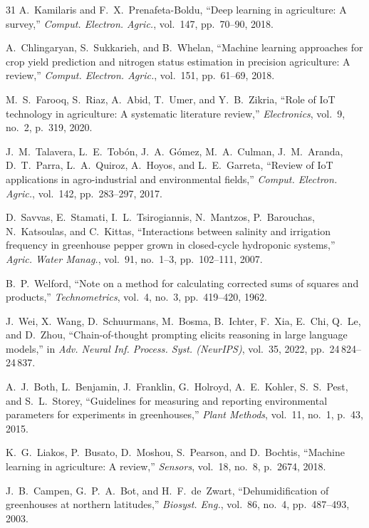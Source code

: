 \documentclass[journal,10pt,twocolumn]{IEEEtran}
\begin{document}
\begin{thebibliography}{31}
A.~Kamilaris and F.~X.~Prenafeta-Boldu,
``Deep learning in agriculture: A survey,''
\emph{Comput. Electron. Agric.}, vol.~147, pp.~70--90, 2018.

A.~Chlingaryan, S.~Sukkarieh, and B.~Whelan,
``Machine learning approaches for crop yield prediction and
nitrogen status estimation in precision agriculture: A review,''
\emph{Comput. Electron. Agric.}, vol.~151, pp.~61--69, 2018.

M.~S.~Farooq, S.~Riaz, A.~Abid, T.~Umer, and Y.~B.~Zikria,
``Role of IoT technology in agriculture: A systematic literature
review,''
\emph{Electronics}, vol.~9, no.~2, p.~319, 2020.

J.~M.~Talavera, L.~E.~Tobón, J.~A.~Gómez, M.~A.~Culman,
J.~M.~Aranda, D.~T.~Parra, L.~A.~Quiroz, A.~Hoyos, and
L.~E.~Garreta,
``Review of IoT applications in agro-industrial and environmental
fields,''
\emph{Comput. Electron. Agric.}, vol.~142, pp.~283--297, 2017.

D.~Savvas, E.~Stamati, I.~L.~Tsirogiannis, N.~Mantzos,
P.~Barouchas, N.~Katsoulas, and C.~Kittas,
``Interactions between salinity and irrigation frequency in
greenhouse pepper grown in closed-cycle hydroponic systems,''
\emph{Agric. Water Manag.}, vol.~91, no.~1--3, pp.~102--111,
2007.

B.~P.~Welford,
``Note on a method for calculating corrected sums of squares
and products,''
\emph{Technometrics}, vol.~4, no.~3, pp.~419--420, 1962.

J.~Wei, X.~Wang, D.~Schuurmans, M.~Bosma, B.~Ichter, F.~Xia,
E.~Chi, Q.~Le, and D.~Zhou,
``Chain-of-thought prompting elicits reasoning in large language
models,''
in \emph{Adv. Neural Inf. Process. Syst. (NeurIPS)}, vol.~35,
2022, pp.~24\,824--24\,837.

A.~J.~Both, L.~Benjamin, J.~Franklin, G.~Holroyd, A.~E.~Kohler,
S.~S.~Pest, and S.~L.~Storey,
``Guidelines for measuring and reporting environmental parameters
for experiments in greenhouses,''
\emph{Plant Methods}, vol.~11, no.~1, p.~43, 2015.

K.~G.~Liakos, P.~Busato, D.~Moshou, S.~Pearson, and
D.~Bochtis,
``Machine learning in agriculture: A review,''
\emph{Sensors}, vol.~18, no.~8, p.~2674, 2018.

J.~B.~Campen, G.~P.~A.~Bot, and H.~F.~de~Zwart,
``Dehumidification of greenhouses at northern latitudes,''
\emph{Biosyst. Eng.}, vol.~86, no.~4, pp.~487--493, 2003.

\end{thebibliography}
\end{document}
